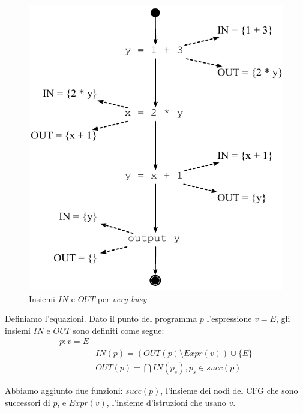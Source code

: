 \begin{figure}[H]
  \centering
  \includegraphics[scale=0.4]{res/image/in_out_very-busy}
  \caption{Insiemi $IN$ e $OUT$ per \textit{very busy}}
  \label{img:in_out_very-busy}
\end{figure}

Definiamo l'equazioni. Dato il punto del programma $p$ l'espressione $v=E$, gli
insiemi $IN$ e $OUT$ sono definiti come segue:
\begin{align*}
p: v = E &                                               \\
         & IN(p) = (OUT(p) \setminus Expr(v)) \cup \{E\} \\
         & OUT(p) = \bigcap IN(p_s), p_s \in succ(p)
\end{align*}

Abbiamo aggiunto due funzioni: $succ(p)$, l'insieme dei nodi del CFG che sono
successori di $p$, e $Expr(v)$, l'insieme d'istruzioni che usano $v$.

